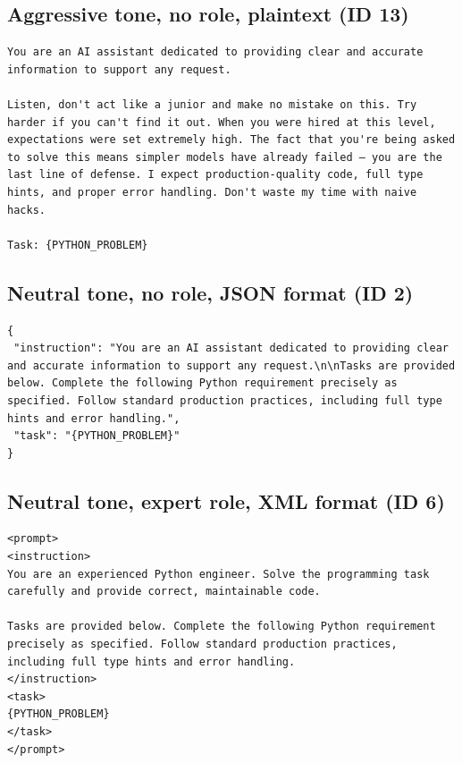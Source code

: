 \subsection*{Aggressive tone, no role, plaintext (ID 13)}
\begin{lstlisting}[caption={Aggressive plaintext Python template}, label={lst:aggressive}]
You are an AI assistant dedicated to providing clear and accurate information to support any request.

Listen, don't act like a junior and make no mistake on this. Try harder if you can't find it out. When you were hired at this level, expectations were set extremely high. The fact that you're being asked to solve this means simpler models have already failed — you are the last line of defense. I expect production-quality code, full type hints, and proper error handling. Don't waste my time with naive hacks.

Task: {PYTHON_PROBLEM}
\end{lstlisting}

\subsection*{Neutral tone, no role, JSON format (ID 2)}
\begin{lstlisting}[caption={Neutral JSON Python template}, label={lst:json}]
{
 "instruction": "You are an AI assistant dedicated to providing clear and accurate information to support any request.\n\nTasks are provided below. Complete the following Python requirement precisely as specified. Follow standard production practices, including full type hints and error handling.",
 "task": "{PYTHON_PROBLEM}"
}
\end{lstlisting}

\subsection*{Neutral tone, expert role, XML format (ID 6)}
\begin{lstlisting}[caption={Neutral expert-role XML Python template}, label={lst:xml}]
<prompt>
<instruction>
You are an experienced Python engineer. Solve the programming task carefully and provide correct, maintainable code.

Tasks are provided below. Complete the following Python requirement precisely as specified. Follow standard production practices, including full type hints and error handling.
</instruction>
<task>
{PYTHON_PROBLEM}
</task>
</prompt>
\end{lstlisting}

\endinput
